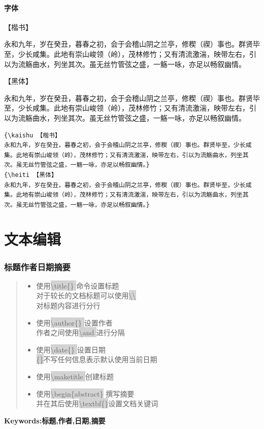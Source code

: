 \documentclass[a4paper,twoside,12pt]{article}
\begin{document}
\subsection{字体}

{\kaishu 【楷书】

永和九年，岁在癸丑，暮春之初，会于会稽山阴之兰亭，修稧（禊）事也。群贤毕至，少长咸集。此地有崇山峻领（岭），茂林修竹；又有清流激湍，映带左右，引以为流觞曲水，列坐其次。虽无丝竹管弦之盛，一觞一咏，亦足以畅叙幽情。}

{\heiti 【黑体】

永和九年，岁在癸丑，暮春之初，会于会稽山阴之兰亭，修稧（禊）事也。群贤毕至，少长咸集。此地有崇山峻领（岭），茂林修竹；又有清流激湍，映带左右，引以为流觞曲水，列坐其次。虽无丝竹管弦之盛，一觞一咏，亦足以畅叙幽情。}

\begin{lstlisting}
{\kaishu 【楷书】
永和九年，岁在癸丑，暮春之初，会于会稽山阴之兰亭，修稧（禊）事也。群贤毕至，少长咸集。此地有崇山峻领（岭），茂林修竹；又有清流激湍，映带左右，引以为流觞曲水，列坐其次。虽无丝竹管弦之盛，一觞一咏，亦足以畅叙幽情。}
{\heiti 【黑体】
永和九年，岁在癸丑，暮春之初，会于会稽山阴之兰亭，修稧（禊）事也。群贤毕至，少长咸集。此地有崇山峻领（岭），茂林修竹；又有清流激湍，映带左右，引以为流觞曲水，列坐其次。虽无丝竹管弦之盛，一觞一咏，亦足以畅叙幽情。}
\end{lstlisting}
\newpage
\part{文本编辑}
\setcounter{section}{0}

\section{标题作者日期摘要}
\begin{abstract}
    \begin{itemize}
        \item 使用\colorbox{lightgray}{\textbackslash title\{\} }命令设置标题 \\ 对于较长的文档标题可以使用\colorbox{lightgray}{\textbackslash\textbackslash} \\对标题内容进行分行
        \item 使用\colorbox{lightgray}{\textbackslash author\{\} }设置作者 \\ 作者之间使用\colorbox{lightgray}{\textbackslash and }进行分隔 
        \item 使用\colorbox{lightgray}{\textbackslash date\{\} }设置日期 \\ \colorbox{lightgray}{\{\}}不写任何信息表示默认使用当前日期
        \item 使用\colorbox{lightgray}{\textbackslash maketitle }创建标题
        \item 使用\colorbox{lightgray}{\textbackslash begin\{abstract\}} 撰写摘要 \\ 并在其后使用\colorbox{lightgray}{\textbackslash textbf\{\}}设置文档关键词
    \end{itemize}
\end{abstract}
\textbf{Keywords:标题,作者,日期,摘要}
\end{document}

